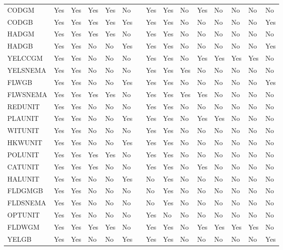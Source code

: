 \begin{sidewaystable}[ht]
{\begin{tabular}{l@{\hspace{\colspc}}
Q 
Q 
Q 
Q 
Q
m{1mm} 
Q 
Q 
Q 
Q 
Q 
Q 
Q 
Q 
}
\hline
CODGM & Yes & Yes & Yes & Yes & No && Yes & Yes & No & Yes & No & No & No & No \\
CODGB & Yes & Yes & Yes & Yes & Yes && Yes & Yes & No & No & No & No & No & Yes \\
HADGM & Yes & Yes & Yes & Yes & No && Yes & Yes & No & No & No & No & No & No \\
HADGB & Yes & Yes & No & No & Yes && Yes & Yes & No & No & No & No & No & Yes \\
YELCCGM & Yes & Yes & No & No & No && Yes & Yes & No & Yes & Yes & Yes & Yes & No \\
YELSNEMA & Yes & Yes & No & No & No && Yes & Yes & Yes & No & No & No & No & No \\
FLWGB & Yes & Yes & No & No & Yes && Yes & Yes & No & No & No & No & No & Yes \\
FLWSNEMA & Yes & Yes & Yes & Yes & No && Yes & Yes & Yes & Yes & No & No & No & No \\
REDUNIT & Yes & Yes & No & No & No && Yes & Yes & No & No & No & No & No & No \\
PLAUNIT & Yes & Yes & No & No & Yes && Yes & Yes & No & Yes & Yes & No & No & No \\
WITUNIT & Yes & Yes & No & No & No && Yes & Yes & No & No & No & No & No & No \\
HKWUNIT & Yes & Yes & No & No & Yes && Yes & Yes & No & No & No & No & No & No \\
POLUNIT & Yes & Yes & Yes & Yes & No && Yes & Yes & No & No & No & No & No & No \\
CATUNIT & Yes & Yes & Yes & No & No && Yes & Yes & No & Yes & No & No & No & No \\
HALUNIT & Yes & Yes & No & No & Yes &&  No & Yes & No & No & No & No & No & No \\
FLDGMGB & Yes & Yes & No & No & No && No & Yes & No & No & No & No & No & No \\
FLDSNEMA & Yes & Yes & No & No & No &&  No & Yes & No & No & No & No & No & No \\
OPTUNIT & Yes & Yes & No & No & No && Yes & No & No & No & No & No & No & No \\
FLDWGM & Yes & Yes & Yes & Yes & No && Yes & Yes & No & Yes & Yes & Yes & Yes & No \\
YELGB & Yes & Yes & No & No & Yes &&  Yes & Yes & No & No & No & No & No & Yes \\
   \hline
\end{tabular}
}

\end{sidewaystable}
